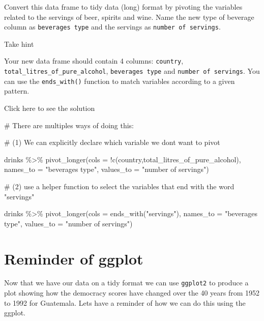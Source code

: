 \documentclass[
  letterpaper,
  DIV=11,
  numbers=noendperiod]{scrartcl}
\newenvironment{Shaded}{\begin{snugshade}}{\end{snugshade}}
\newcommand{\AttributeTok}[1]{\textcolor[rgb]{0.40,0.45,0.13}{#1}}
\newcommand{\CommentTok}[1]{\textcolor[rgb]{0.37,0.37,0.37}{#1}}
\newcommand{\FunctionTok}[1]{\textcolor[rgb]{0.28,0.35,0.67}{#1}}
\newcommand{\NormalTok}[1]{\textcolor[rgb]{0.00,0.23,0.31}{#1}}
\newcommand{\SpecialCharTok}[1]{\textcolor[rgb]{0.37,0.37,0.37}{#1}}
\newcommand{\StringTok}[1]{\textcolor[rgb]{0.13,0.47,0.30}{#1}}
\begin{document}
\begin{tcolorbox}
Convert this data frame to tidy data (long) format by pivoting the
variables related to the servings of beer, spirits and wine. Name the
new type of beverage column as \texttt{beverages\ type} and the servings
as \texttt{number\ of\ servings}.

Take hint

Your new data frame should contain 4 columns: \texttt{country},
\texttt{total\_litres\_of\_pure\_alcohol}, \texttt{beverages\ type} and
\texttt{number\ of\ servings}. You can use the \texttt{ends\_with()}
function to match variables according to a given pattern.

Click here to see the solution

\begin{Shaded}
\begin{Highlighting}[]
\CommentTok{\# There are multiples ways of doing this:}

\CommentTok{\# (1) We can explicitly declare which variable we don\textquotesingle{}t want to pivot}

\NormalTok{drinks }\SpecialCharTok{\%\textgreater{}\%}
  \FunctionTok{pivot\_longer}\NormalTok{(}\AttributeTok{cols =} \SpecialCharTok{!}\FunctionTok{c}\NormalTok{(country,total\_litres\_of\_pure\_alcohol),}
               \AttributeTok{names\_to =} \StringTok{"beverages type"}\NormalTok{,}
               \AttributeTok{values\_to =} \StringTok{"number of servings"}\NormalTok{)}

\CommentTok{\# (2) use a helper function to select the variables that end with the word "servings"}

\NormalTok{drinks }\SpecialCharTok{\%\textgreater{}\%}
  \FunctionTok{pivot\_longer}\NormalTok{(}\AttributeTok{cols =} \FunctionTok{ends\_with}\NormalTok{(}\StringTok{"servings"}\NormalTok{),}
               \AttributeTok{names\_to =} \StringTok{"beverages type"}\NormalTok{,}
               \AttributeTok{values\_to =} \StringTok{"number of servings"}\NormalTok{)}
\end{Highlighting}
\end{Shaded}

\end{tcolorbox}

\section{Reminder of ggplot}\label{reminder-of-ggplot}

Now that we have our data on a tidy format we can use \texttt{ggplot2}
to produce a plot showing how the democracy scores have changed over the
40 years from 1952 to 1992 for Guatemala. Lets have a reminder of how we
can do this using the ggplot.
\end{document}
